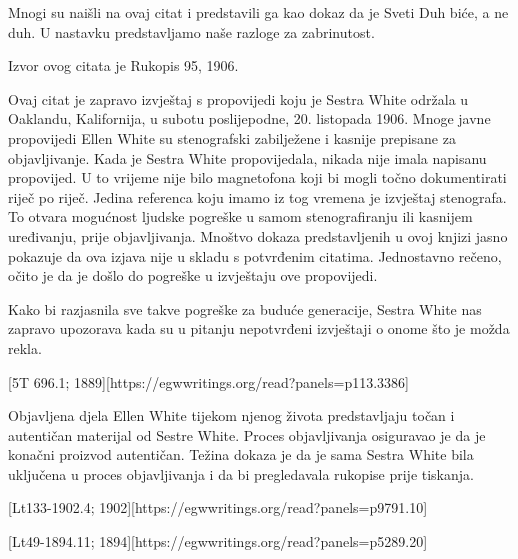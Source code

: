 Mnogi su naišli na ovaj citat i predstavili ga kao dokaz da je Sveti Duh biće, a ne duh. U nastavku predstavljamo naše razloge za zabrinutost.

Izvor ovog citata je Rukopis 95, 1906.

Ovaj citat je zapravo izvještaj s propovijedi koju je Sestra White održala u Oaklandu, Kalifornija, u subotu poslijepodne, 20. listopada 1906. Mnoge javne propovijedi Ellen White su stenografski zabilježene i kasnije prepisane za objavljivanje. Kada je Sestra White propovijedala, nikada nije imala napisanu propovijed. U to vrijeme nije bilo magnetofona koji bi mogli točno dokumentirati riječ po riječ. Jedina referenca koju imamo iz tog vremena je izvještaj stenografa. To otvara mogućnost ljudske pogreške u samom stenografiranju ili kasnijem uređivanju, prije objavljivanja. Mnoštvo dokaza predstavljenih u ovoj knjizi jasno pokazuje da ova izjava nije u skladu s potvrđenim citatima. Jednostavno rečeno, očito je da je došlo do pogreške u izvještaju ove propovijedi.

Kako bi razjasnila sve takve pogreške za buduće generacije, Sestra White nas zapravo upozorava kada su u pitanju nepotvrđeni izvještaji o onome što je možda rekla.

[5T 696.1; 1889][https://egwwritings.org/read?panels=p113.3386]

Objavljena djela Ellen White tijekom njenog života predstavljaju točan i autentičan materijal od Sestre White. Proces objavljivanja osiguravao je da je konačni proizvod autentičan. Težina dokaza je da je sama Sestra White bila uključena u proces objavljivanja i da bi pregledavala rukopise prije tiskanja.

[Lt133-1902.4; 1902][https://egwwritings.org/read?panels=p9791.10]


[Lt49-1894.11; 1894][https://egwwritings.org/read?panels=p5289.20]


